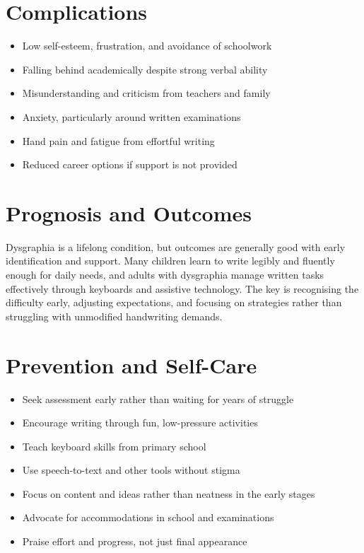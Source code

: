 \section*{Complications}
\begin{itemize}
    \item Low self-esteem, frustration, and avoidance of schoolwork
    \item Falling behind academically despite strong verbal ability
    \item Misunderstanding and criticism from teachers and family
    \item Anxiety, particularly around written examinations
    \item Hand pain and fatigue from effortful writing
    \item Reduced career options if support is not provided
\end{itemize}

\section*{Prognosis and Outcomes}
Dysgraphia is a lifelong condition, but outcomes are generally good with early identification and support. Many children learn to write legibly and fluently enough for daily needs, and adults with dysgraphia manage written tasks effectively through keyboards and assistive technology. The key is recognising the difficulty early, adjusting expectations, and focusing on strategies rather than struggling with unmodified handwriting demands.

\section*{Prevention and Self-Care}
\begin{itemize}
    \item Seek assessment early rather than waiting for years of struggle
    \item Encourage writing through fun, low-pressure activities
    \item Teach keyboard skills from primary school
    \item Use speech-to-text and other tools without stigma
    \item Focus on content and ideas rather than neatness in the early stages
    \item Advocate for accommodations in school and examinations
    \item Praise effort and progress, not just final appearance
\end{itemize}

